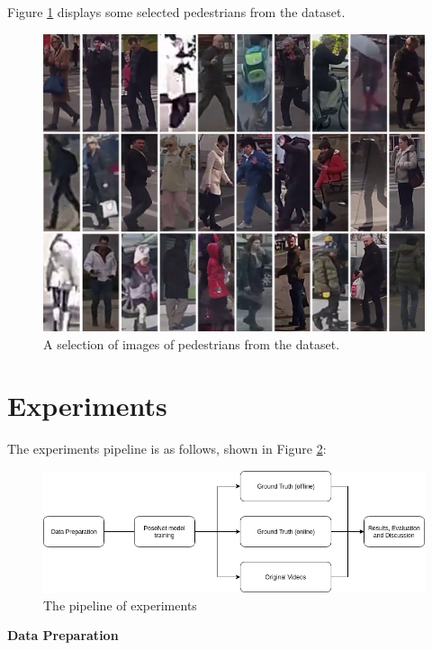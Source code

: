 Figure \ref{fig:jaad_pedestrian_samples} displays some selected pedestrians from the dataset.

\begin{figure}[h!]
  \centering
  \includegraphics[width=0.6\linewidth]{ExpAndDiss/jaad_pedestrian_samples.png}
  \caption{A selection of images of pedestrians from the dataset. \cite{rasouli2017they}}
  \label{fig:jaad_pedestrian_samples}
\end{figure}

\section{Experiments}
The experiments pipeline is as follows, shown in Figure \ref{fig:exp_pipe}:

\begin{figure}[H]
  \centering
  \includegraphics[width=0.8\linewidth]{ExpAndDiss/exp_pipe.png}
  \caption{The pipeline of experiments}
  \label{fig:exp_pipe}
\end{figure}

\textbf{Data Preparation}

